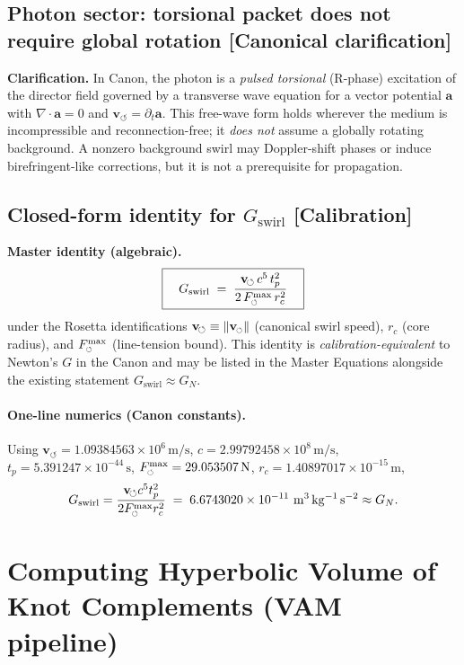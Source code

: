 \documentclass[10pt,reprint,aps,onecolumn,nofootinbib]{revtex4-2}
\newcommand{\vswirl}{\mathbf{v}_{\!\boldsymbol{\circlearrowleft}}}
\newcommand{\Fmaxswirl}{F^{\max}_{\mkern-1mu\scriptscriptstyle\boldsymbol{\circlearrowleft}}}
\newcommand{\Fmax}{\Fmaxswirl} %
\newcommand{\vnorm}{\lVert \mathbf{v}_{\mkern-2mu\scriptscriptstyle\boldsymbol{\circlearrowleft}} \rVert}               %
\newcommand{\Ce}{\vswirl}                                %
\newcommand{\rc}{r_c}                                    %
\newcommand{\statusCalibration}{\textsf{[Calibration]}}
\newcommand{\statusCanonical}{\textsf{[Canonical clarification]}}
\begin{document}
\subsection{Photon sector: torsional packet does not require global rotation \statusCanonical}
\textbf{Clarification.}
In Canon, the photon is a \emph{pulsed torsional} (R-phase) excitation of the director field governed by a transverse wave equation for a vector potential \(\mathbf a\) with \(\nabla\!\cdot\!\mathbf a=0\) and \(\vswirl=\partial_t\mathbf a\). This free-wave form holds wherever the medium is incompressible and reconnection-free; it \emph{does not} assume a globally rotating background. A nonzero background swirl may Doppler-shift phases or induce birefringent-like corrections, but it is not a prerequisite for propagation.

\subsection{Closed-form identity for \(G_{\text{swirl}}\) \statusCalibration}
\textbf{Master identity (algebraic).}
\[
    \boxed{\quad
    G_{\text{swirl}}
        \;=\;
        \frac{\Ce\,c^{5}\,t_p^{2}}{2\,\Fmax\,\rc^{2}}
        \quad}
\]
under the Rosetta identifications \(\Ce\equiv \vnorm\) (canonical swirl speed), \(\rc\) (core radius), and \(\Fmax\) (line-tension bound). This identity is \emph{calibration-equivalent} to Newton’s \(G\) in the Canon and may be listed in the Master Equations alongside the existing statement \(G_{\text{swirl}}\approx G_N\).

\paragraph{One-line numerics (Canon constants).}
    Using
    \(\Ce=1.09384563\times10^{6}\,\mathrm{m/s}\),
    \(c=2.99792458\times10^{8}\,\mathrm{m/s}\),
    \(t_p=5.391247\times10^{-44}\,\mathrm{s}\),
    \(\Fmax=29.053507\,\mathrm{N}\),
    \(\rc=1.40897017\times10^{-15}\,\mathrm{m}\),
    \[
        G_{\text{swirl}}
        =\frac{\Ce c^5 t_p^2}{2\Fmax \rc^2}
        \;=\;6.6743020\times10^{-11}\ \mathrm{m^3\,kg^{-1}\,s^{-2}}
        \approx G_N.
    \]


\section{Computing Hyperbolic Volume of Knot Complements (VAM pipeline)}
\end{document}
